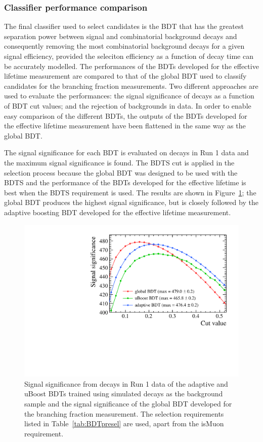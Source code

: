 \subsubsection{Classifier performance comparison}

The final classifier used to select \bsmumu candidates is the BDT that has the greatest separation power between signal and combinatorial background decays and consequently removing the most combinatorial background decays for a given signal efficiency, provided the seleciton efficiency as a function of decay time can be accurately modelled. The performances of the BDTs developed for the effective lifetime measurement are compared to that of the global BDT used to classify candidates for the branching fraction measurements. Two different approaches are used to evaluate the performances: the signal significance of \bhh decays as a function of BDT cut values; and the rejection of \bsmumu backgrounds in data. In order to enable easy comparison of the different BDTs, the outputs of the BDTs developed for the effective lifetime measurement have been flattened in the same way as the global BDT. %

The signal significance for each BDT is evaluated on \bhh decays in Run 1 data and the maximum signal significance is found. The BDTS cut is applied in the selection process because the global BDT was designed to be used with the BDTS and the performance of the BDTs developed for the effective lifetime is best when the BDTS requirement is used. The results are shown in Figure~\ref{fig:SSall}; the global BDT produces the highest signal significance, but is closely followed by the adaptive boosting BDT developed for the effective lifetime measurement. 

\begin{figure}[htbp]
    \centering
        \includegraphics[width=0.6 \textwidth]{./Figs/Selection/BDT_comp_zoom.pdf}
    \caption{Signal significance from \bhh decays in Run 1 data of the adaptive and uBoost BDTs trained using simulated decays as the background sample and the signal significance of the global BDT developed for the branching fraction measurement. The selection requirements listed in Table~\ref{tab:BDTpresel} are used, apart from the isMuon requirement. }
    \label{fig:SSall}
\end{figure}


